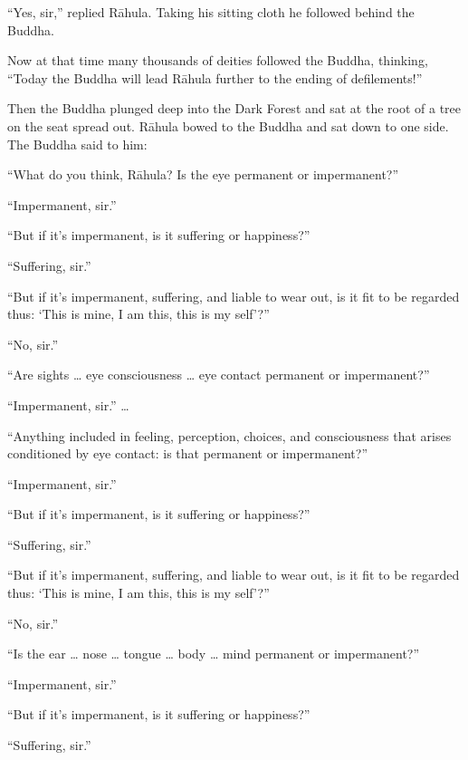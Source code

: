 \documentclass[12pt,openany]{book}%
\begin{document}
“Yes, sir,” replied \textsanskrit{Rāhula}. Taking his sitting cloth he followed behind the Buddha. 

Now at that time many thousands of deities followed the Buddha, thinking, “Today the Buddha will lead \textsanskrit{Rāhula} further to the ending of defilements!” 

Then the Buddha plunged deep into the Dark Forest and sat at the root of a tree on the seat spread out. \textsanskrit{Rāhula} bowed to the Buddha and sat down to one side. The Buddha said to him: 

“What do you think, \textsanskrit{Rāhula}? Is the eye permanent or impermanent?” 

“Impermanent, sir.” 

“But if it’s impermanent, is it suffering or happiness?” 

“Suffering, sir.” 

“But if it’s impermanent, suffering, and liable to wear out, is it fit to be regarded thus: ‘This is mine, I am this, this is my self’?” 

“No, sir.” 

“Are sights … eye consciousness … eye contact permanent or impermanent?” 

“Impermanent, sir.” … 

“Anything included in feeling, perception, choices, and consciousness that arises conditioned by eye contact: is that permanent or impermanent?” 

“Impermanent, sir.” 

“But if it’s impermanent, is it suffering or happiness?” 

“Suffering, sir.” 

“But if it’s impermanent, suffering, and liable to wear out, is it fit to be regarded thus: ‘This is mine, I am this, this is my self’?” 

“No, sir.” 

“Is the ear … nose … tongue … body … mind permanent or impermanent?” 

“Impermanent, sir.” 

“But if it’s impermanent, is it suffering or happiness?” 

“Suffering, sir.” 
\end{document}
